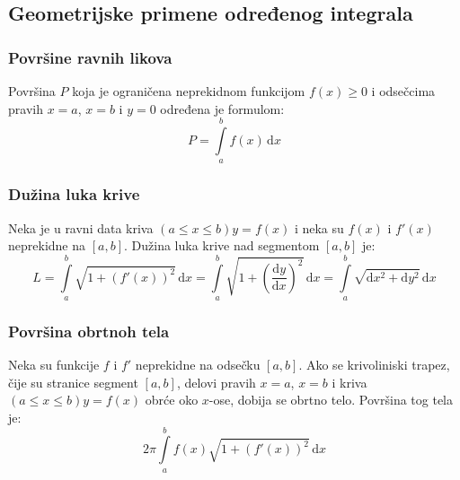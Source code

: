 \subsection{Geometrijske primene određenog integrala}


\subsubsection{Površine ravnih likova}
\begin{theorem}
	Površina $P$ koja je ograničena neprekidnom funkcijom $f(x)\geq 0$ i odsečcima pravih $x=a$, $x=b$ i $y=0$ određena je formulom:
	$$P  = \int \limits^b_a f(x) \, \mathrm{d}x$$
\end{theorem}

\subsubsection{Dužina luka krive}
\begin{theorem}
	Neka je u ravni data kriva $(a\leq x \leq b) y=f(x)$ i neka su $f(x)$ i $f'(x)$ neprekidne na $[a,b]$. Dužina luka krive nad segmentom $[a,b]$ je:
	$$L = \int \limits^b_a \sqrt{1+(f'(x))^2} \, \mathrm{d}x = \int \limits^b_a \sqrt{1+(\frac{\mathrm{d}y}{\mathrm{d}x})^2} \, \mathrm{d}x = \int \limits^b_a \sqrt{\mathrm{d}x^2 + \mathrm{d}y^2} \, \mathrm{d}x$$
\end{theorem}

\subsubsection{Površina obrtnoh tela}
\begin{theorem}
	Neka su funkcije $f$ i $f'$ neprekidne na odsečku $[a,b]$. Ako se krivoliniski trapez, čije su stranice segment $[a,b]$, delovi pravih $x=a$, $x=b$ i kriva $(a\leq x \leq b) y=f(x)$ obrće oko $x$-ose, dobija se obrtno telo. Površina tog tela je:
	$$2\pi \int \limits^b_a f(x) \sqrt{1+(f'(x))^2}\, \mathrm{d}x$$
\end{theorem}


